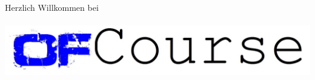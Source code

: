 \documentclass[a4paper, 12pt]{scrreprt}
\begin{document}
\ \\
\ \\
\begin{center}
	{\Large Herzlich Willkommen bei \ \\}
	\ \\
\includegraphics[width=0.5\linewidth]{logo/name_blau_ofCourse}
\end{center}
\end{document}
